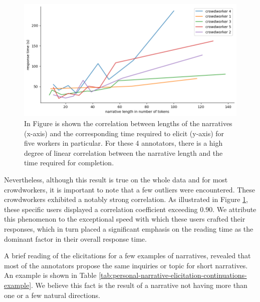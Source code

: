\begin{figure}[!htbp]
        \includegraphics[width=1\linewidth]{assets//imgs/dataset-high-correlation-workers.png}
        \caption{In Figure is shown the correlation between lengths of the narratives (x-axis) and the corresponding time required to elicit (y-axis) for five workers in particular. For these 4 annotators, there is a high degree of linear correlation between the narrative length and the time required for completion.}
        \label{fig:dataset-high-correlation-workers}
\end{figure}
Nevertheless, although this result is true on the whole data and for most crowdworkers, it is important to note that a few outliers were encountered. These crowdworkers exhibited a notably strong correlation. As illustrated in Figure \ref{fig:dataset-high-correlation-workers}, these specific users displayed a correlation coefficient exceeding 0.90. We attribute this phenomenon to the exceptional speed with which these users crafted their responses, which in turn placed a significant emphasis on the reading time as the dominant factor in their overall response time.


A brief reading of the elicitations for a few examples of narratives, revealed that most of the annotators propose the same inquiries or topic for short narratives. An example is shown in Table \ref{tab:personal-narrative-elicitation-continuations-example}. We believe this fact is the result of a narrative not having more than one or a few natural directions.%
